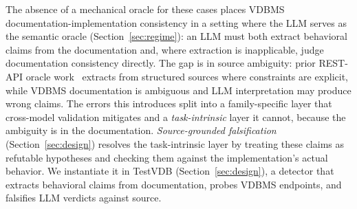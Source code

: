 \documentclass[sigconf]{acmart}
\begin{document}
The absence of a mechanical oracle for these cases places VDBMS documentation-implementation consistency in a setting where the LLM serves as the semantic oracle (Section~\ref{sec:regime}): an LLM must both extract behavioral claims from the documentation and, where extraction is inapplicable, judge documentation consistency directly. The gap is in source ambiguity: prior REST-API oracle work~\cite{agoraplus25,satori25,mastor26} extracts from structured sources where constraints are explicit, while VDBMS documentation is ambiguous and LLM interpretation may produce wrong claims. The errors this introduces split into a family-specific layer that cross-model validation mitigates and a \emph{task-intrinsic} layer it cannot, because the ambiguity is in the documentation. \emph{Source-grounded falsification} (Section~\ref{sec:design}) resolves the task-intrinsic layer by treating these claims as refutable hypotheses and checking them against the implementation's actual behavior. We instantiate it in TestVDB (Section~\ref{sec:design}), a detector that extracts behavioral claims from documentation, probes VDBMS endpoints, and falsifies LLM verdicts against source.
\end{document}
